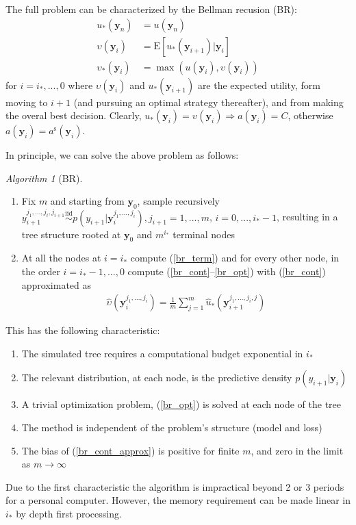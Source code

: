 \documentclass[11pt]{article}
\begin{document}
The full problem can be characterized by the Bellman recusion (BR):
\begin{align}\label{br_term}
u_*(\mathbf{y}_n)&=u(\mathbf{y}_n)\\\label{br_cont}
\upsilon(\mathbf{y}_i)&=\mathrm{E}[u_*(\mathbf{y}_{i+1})|\mathbf{y}_i]\\\label{br_opt}
\upsilon_*(\mathbf{y}_i)&=\max(u(\mathbf{y}_i),\upsilon(\mathbf{y}_i))
\end{align}for $i=i_*,...,0$ where $\upsilon(\mathbf{y}_i)$ and $u_*(\mathbf{y}_{i+1})$ are the expected utility, form moving to $i+1$ (and pursuing an optimal strategy thereafter), and from making the overal best decision. Clearly, $u_*(\mathbf{y}_i)=\upsilon(\mathbf{y}_i)\Rightarrow a(\mathbf{y}_i)=C$, otherwise $a(\mathbf{y}_i)=a^{\mathrm{s}}(\mathbf{y}_i)$.

In principle, we can solve the above problem as follows:
\theoremstyle{remark}
\newtheorem{algorithm}{Algorithm}
\begin{algorithm}[BR]\label{alg:BR}
\hfill\par
\begin{enumerate}
\item Fix $m$ and starting from $\mathbf{y}_0$, sample recursively $y_{i+1}^{j_1,...,j_i,j_{i+1}}\stackrel{\mathrm{iid}}{\sim}p(y_{i+1}|\mathbf{y}_{i}^{j_1,...,j_i}), j_{i+1}=1,...,m$, $i=0,...,i_*-1$, resulting in a tree structure rooted at $\mathbf{y}_0$ and $m^{i_*}$ terminal nodes\\
\item At all the nodes at $i=i_*$ compute (\ref{br_term}) and for every other node, in the order $i=i_*-1,...,0$ compute (\ref{br_cont}--\ref{br_opt}) with (\ref{br_cont}) approximated as 
\begin{align}\label{br_cont_approx}
\hat \upsilon(\mathbf{y}_i^{j_1,...,j_i})=\frac{1}{m}\sum_{j=1}^m \hat u_*(\mathbf{y}_{i+1}^{j_1,...,j_i,j})
\end{align}
\end{enumerate}
\end{algorithm}
This has the following characteristic:
\begin{enumerate}
\item The simulated tree requires a computational budget exponential in $i_*$\\
\item The relevant distribution, at each node, is the predictive density $p(y_{i+1}|\mathbf{y}_i)$\\
\item A trivial optimization problem, (\ref{br_opt}) is solved at each node of the tree\\
\item The method is independent of the problem's structure (model and loss)
\item The bias of (\ref{br_cont_approx}) is positive for finite $m$, and zero in the limit as $m\rightarrow\infty$
\end{enumerate}Due to the first characteristic the algorithm is impractical beyond 2 or 3 periods for a personal computer. However, the memory requirement can be made linear in $i_*$ by depth first processing.
\end{document}
